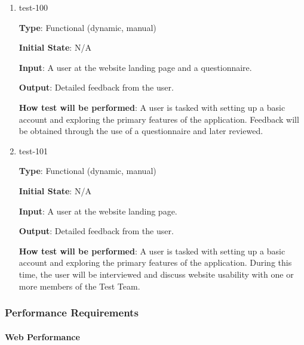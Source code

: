 \documentclass[12pt, titlepage]{article}
\begin{document}
\begin{enumerate}

\item{test-100\\}

\textbf{Type}: Functional (dynamic, manual)
					
\textbf{Initial State}: N/A
					
\textbf{Input}: A user at the website landing page and a questionnaire.
					
\textbf{Output}: Detailed feedback from the user.
					
\textbf{How test will be performed}: A user is tasked with setting up a basic account and exploring the primary features of the application. Feedback will be obtained through the use of a questionnaire and later reviewed.
					
\item{test-101\\}

\textbf{Type}: Functional (dynamic, manual)
					
\textbf{Initial State}: N/A
					
\textbf{Input}: A user at the website landing page.
					
\textbf{Output}: Detailed feedback from the user.
					
\textbf{How test will be performed}: A user is tasked with setting up a basic account and exploring the primary features of the application. During this time, the user will be interviewed and discuss website usability with one or more members of the Test Team.

\end{enumerate}

\subsubsection{Performance Requirements}
		
\paragraph{Web Performance}
\end{document}
